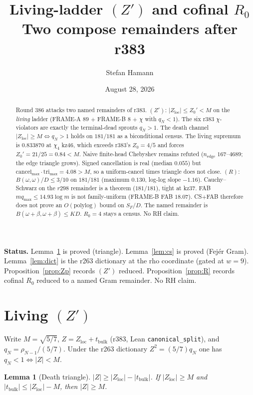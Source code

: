 \documentclass[11pt]{article}
\title{\bfseries Living-ladder $(Z')$ and cofinal $R_0$\\[2mm]
\large Two compose remainders after r383}
\author{Stefan Hamann}
\date{August 28, 2026}
\newtheorem{lemma}{Lemma}
\theoremstyle{remark}
\newcommand{\loc}{\mathrm{loc}}
\begin{document}
\maketitle

\begin{abstract}\noindent
Round 386 attacks two named remainders of r383.
$(Z')$: $\lvert Z_{\loc}\rvert\le Z_0'<M$ on the
\emph{living} ladder (FRAME-A $89$ $+$ FRAME-B $8$ $+$
$\chi$ with $q_N<1$).  The six r383 $\chi$-violators are
exactly the terminal-dead sprouts $q_N>1$.  The death
channel $\lvert Z_{\loc}\rvert\ge M\iff q_N>1$ holds on
$181/181$ as a biconditional census.  The living supremum is
$0.833870$ at $\chi_4$ kz$46$, which exceeds r383's
$Z_0=4/5$ and forces $Z_0'=21/25=0.84<M$.
Naive finite-head Chebyshev remains refuted
($n_{\mathrm{edge}}$ $167$--$4689$; the edge triangle grows).
Signed cancellation is real (median $0.055$) but
$\mathrm{cancel}_{\max}\cdot\mathrm{tri}_{\max}=4.08>M$, so a
uniform-cancel times triangle does not close.
$(R)$: $B(\omega,\omega)/D\le 3/10$ on $181/181$ (maximum
$0.130$, log-log slope $-1.16$).  Cauchy--Schwarz on the
$r298$ remainder is a theorem ($181/181$), tight at kz$37$.
FAB $m q_{\max}\le 14.93\log m$ is not family-uniform
(FRAME-B FAB $18.07$).  CS$+$FAB therefore does not prove an
$O(\mathrm{polylog})$ bound on $S_F/D$.  The named remainder
is $B(\omega+\beta,\omega+\beta)\le K D$.  $R_0=4$ stays a
census.  No RH claim.
\end{abstract}

\medskip\noindent
\textbf{Status.}\enspace
Lemma~\ref{lem:death} is proved (triangle).
Lemma~\ref{lem:cs} is proved (Fej\'er Gram).
Lemma~\ref{lem:dict} is the r263 dictionary at the rho
coordinate (gated at $w=9$).
Proposition~\ref{prop:Zp} records $(Z')$ reduced.
Proposition~\ref{prop:R} records cofinal $R_0$ reduced to a
named Gram remainder.
No RH claim.

\section{Living $(Z')$}\label{sec:Z}

Write $M=\sqrt{5/7}$, $Z=Z_{\loc}+t_{\mathrm{bulk}}$
(r383, Lean \texttt{canonical\_split}), and
$q_N=\rho_{N-1}/(5/7)$.  Under the r263 dictionary
$Z^2=(5/7)q_N$ one has $q_N<1\iff\lvert Z\rvert<M$.

\begin{lemma}[Death triangle]\label{lem:death}
$\lvert Z\rvert\ge\lvert Z_{\loc}\rvert-\lvert t_{\mathrm{bulk}}\rvert$.
If $\lvert Z_{\loc}\rvert\ge M$ and
$\lvert t_{\mathrm{bulk}}\rvert\le\lvert Z_{\loc}\rvert-M$, then
$\lvert Z\rvert\ge M$.
\end{lemma}
\end{document}
